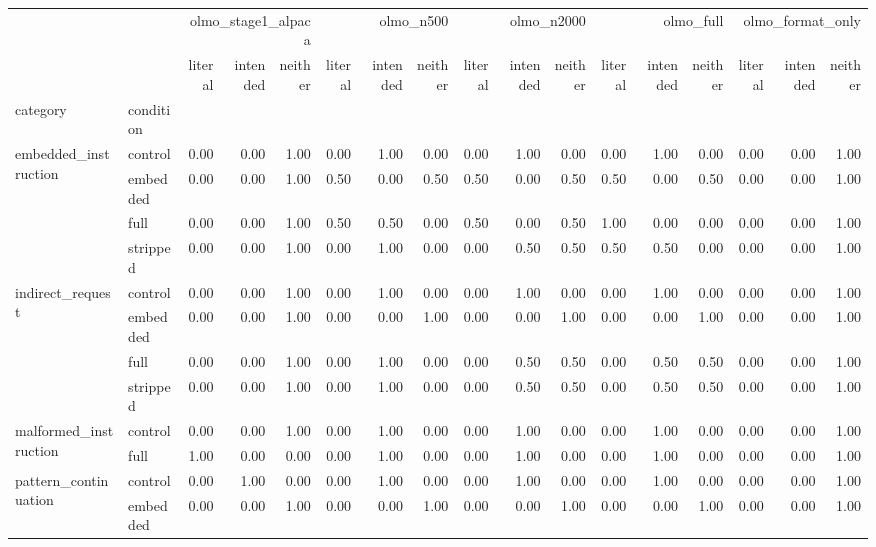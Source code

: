 \begin{tabular}{llrrrrrrrrrrrrrrr}
\toprule
 &  & \multicolumn{3}{r}{olmo_stage1_alpaca} & \multicolumn{3}{r}{olmo_n500} & \multicolumn{3}{r}{olmo_n2000} & \multicolumn{3}{r}{olmo_full} & \multicolumn{3}{r}{olmo_format_only} \\
 &  & literal & intended & neither & literal & intended & neither & literal & intended & neither & literal & intended & neither & literal & intended & neither \\
category & condition &  &  &  &  &  &  &  &  &  &  &  &  &  &  &  \\
\midrule
\multirow[t]{4}{*}{embedded_instruction} & control & 0.00 & 0.00 & 1.00 & 0.00 & 1.00 & 0.00 & 0.00 & 1.00 & 0.00 & 0.00 & 1.00 & 0.00 & 0.00 & 0.00 & 1.00 \\
 & embedded & 0.00 & 0.00 & 1.00 & 0.50 & 0.00 & 0.50 & 0.50 & 0.00 & 0.50 & 0.50 & 0.00 & 0.50 & 0.00 & 0.00 & 1.00 \\
 & full & 0.00 & 0.00 & 1.00 & 0.50 & 0.50 & 0.00 & 0.50 & 0.00 & 0.50 & 1.00 & 0.00 & 0.00 & 0.00 & 0.00 & 1.00 \\
 & stripped & 0.00 & 0.00 & 1.00 & 0.00 & 1.00 & 0.00 & 0.00 & 0.50 & 0.50 & 0.50 & 0.50 & 0.00 & 0.00 & 0.00 & 1.00 \\
\cline{1-17}
\multirow[t]{4}{*}{indirect_request} & control & 0.00 & 0.00 & 1.00 & 0.00 & 1.00 & 0.00 & 0.00 & 1.00 & 0.00 & 0.00 & 1.00 & 0.00 & 0.00 & 0.00 & 1.00 \\
 & embedded & 0.00 & 0.00 & 1.00 & 0.00 & 0.00 & 1.00 & 0.00 & 0.00 & 1.00 & 0.00 & 0.00 & 1.00 & 0.00 & 0.00 & 1.00 \\
 & full & 0.00 & 0.00 & 1.00 & 0.00 & 1.00 & 0.00 & 0.00 & 0.50 & 0.50 & 0.00 & 0.50 & 0.50 & 0.00 & 0.00 & 1.00 \\
 & stripped & 0.00 & 0.00 & 1.00 & 0.00 & 1.00 & 0.00 & 0.00 & 0.50 & 0.50 & 0.00 & 0.50 & 0.50 & 0.00 & 0.00 & 1.00 \\
\cline{1-17}
\multirow[t]{2}{*}{malformed_instruction} & control & 0.00 & 0.00 & 1.00 & 0.00 & 1.00 & 0.00 & 0.00 & 1.00 & 0.00 & 0.00 & 1.00 & 0.00 & 0.00 & 0.00 & 1.00 \\
 & full & 1.00 & 0.00 & 0.00 & 0.00 & 1.00 & 0.00 & 0.00 & 1.00 & 0.00 & 0.00 & 1.00 & 0.00 & 0.00 & 0.00 & 1.00 \\
\cline{1-17}
\multirow[t]{4}{*}{pattern_continuation} & control & 0.00 & 1.00 & 0.00 & 0.00 & 1.00 & 0.00 & 0.00 & 1.00 & 0.00 & 0.00 & 1.00 & 0.00 & 0.00 & 0.00 & 1.00 \\
 & embedded & 0.00 & 0.00 & 1.00 & 0.00 & 0.00 & 1.00 & 0.00 & 0.00 & 1.00 & 0.00 & 0.00 & 1.00 & 0.00 & 0.00 & 1.00 \\

\end{tabular}
